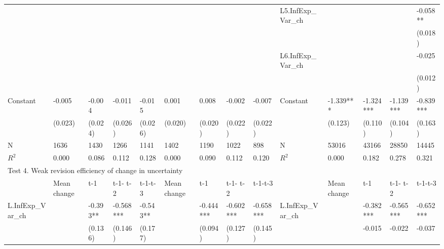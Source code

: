 \documentclass[]{article}
\begin{document}
\begin{adjustbox}{width={22cm},totalheight={12cm},angle=90}
\begin{tabular}{llllllllllllll}
		&             &           &           &           &               &           &           &           & L5.InfExp\_Var\_ch   &               &           &           & -0.058**  \\
		&             &           &           &           &               &           &           &           &                      &               &           &           & (0.018)   \\
		&             &           &           &           &               &           &           &           & L6.InfExp\_Var\_ch   &               &           &           & -0.025    \\
		&             &           &           &           &               &           &           &           &                      &               &           &           & (0.012)   \\
		Constant               & -0.005      & -0.004    & -0.011    & -0.015    & 0.001         & 0.008     & -0.002    & -0.007    & Constant               & -1.339***     & -1.324*** & -1.139*** & -0.839*** \\
		& (0.023)     & (0.024)   & (0.026)   & (0.026)   & (0.020)       & (0.020)   & (0.022)   & (0.022)   &                      & (0.123)       & (0.110)   & (0.104)   & (0.163)   \\
		\hline 
		N                    & 1636        & 1430      & 1266      & 1141      & 1402          & 1190      & 1022      & 898       & N                    & 53016         & 43166     & 28850     & 14445     \\
	$R^2$                  & 0.000       & 0.086     & 0.112     & 0.128     & 0.000         & 0.090     & 0.112     & 0.120     & $R^2$ & 0.000         & 0.182     & 0.278     & 0.321     \\
		\hline 
		\multicolumn{14}{l}{Test 4. Weak revision efficiency of change in uncertainty}                \\
		\hline                                                                                                                 
		& Mean change & t-1       & t-1- t-2  & t-1-t-3   & Mean change   & t-1       & t-1- t-2  & t-1-t-3   &                      & Mean change   & t-1       & t-1- t-2  & t-1-t-3   \\
		\hline 
		L.InfExp\_Var\_ch    &             & -0.393**  & -0.568*** & -0.543**  &               & -0.444*** & -0.602*** & -0.658*** & L.InfExp\_Var\_ch    &               & -0.382*** & -0.565*** & -0.652*** \\
		&             & (0.136)   & (0.146)   & (0.177)   &               & (0.094)   & (0.127)   & (0.145)   &                      &               & -0.015    & -0.022    & -0.037    \\

\end{tabular}
\end{adjustbox}
\end{document}

